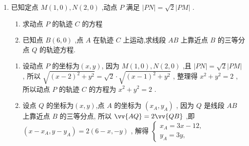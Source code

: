 \begin{enumerate}
\begin{enumerate}
\begin{jieda}
\begin{enumerate}
                \item 设 $M\left( {x,y}\right) ,C\left( {{x}_{0},{y}_{0}}\right)$ ,
                
                因为 $B\left( {3,0}\right)$ ,且 $M$ 是线段 ${BC}$ 的中点，所以由中点坐标公式得 $x = \dfrac{{x}_{0} + 3}{2},y = \dfrac{{y}_{0} + 0}{2}$，所以 ${x}_{0} = {2x} - 3,{y}_{0} = {2y}$ .
                
                由 (1) 知,点 $C$ 的轨迹方程为${\left( x - 1\right) }^{2} + {y}^{2} = 4\left( {y \neq  0}\right)$，将 ${x}_{0} = {2x} - 3,{y}_{0} = {2y}$ 代入得${\left( 2x - 4\right) }^{2} + {\left( 2y\right) }^{2} = 4,$ 即 ${\left( x - 2\right) }^{2} + {y}^{2} = 1\left( {y \neq  0}\right)$ . 
                
                因此动点 $M$ 的轨迹方程为 ${\left( x - 2\right) }^{2} + {y}^{2} = 1\left( {y \neq  0}\right) .$
            \end{enumerate}
        \end{jieda}
        \item 已知定点 $M\left( {1,0}\right) ,N\left( {2,0}\right)$ ,动点 $P$ 满足 $\left| {PN}\right|  = \sqrt{2}\left| {PM}\right|$ . 
        \begin{enumerate}
            \item 求动点 $P$ 的轨迹 $C$ 的方程
            \item 已知点 $B\left( {6,0}\right)$ ,点 $A$ 在轨迹 $C$ 上运动,求线段 ${AB}$ 上靠近点 $B$ 的三等分点 $Q$ 的轨迹方程.
        \end{enumerate}
        \begin{jieda}
            \begin{enumerate}
                \item 设动点 $P$ 的坐标为$(x, y)$, 因为 $M\left( {1,0}\right) ,N\left( {2,0}\right)$ ,且 $\left| {PN}\right|  = \sqrt{2}\left| {PM}\right|$ , 所以 $\sqrt{{\left( x - 2\right) }^{2} + {y}^{2}} = \sqrt{2} \cdot  \sqrt{{\left( x - 1\right) }^{2} + {y}^{2}}$ , 整理得 ${x}^{2} + {y}^{2} = 2$ , 所以动点 $P$ 的轨迹 $C$ 的方程为 ${x}^{2} + {y}^{2} = 2$ .
                \item 设点 $Q$ 的坐标为$(x, y)$,点 $A$ 的坐标为 $\left( {{x}_{A},{y}_{A}}\right)$ , 因为 $Q$ 是线段 ${AB}$ 上靠近点 $B$ 的三等分点, 所以 $\vv{AQ} = 2\vv{QB}$ ,即 $\left( {x - {x}_{A},y - {y}_{A}}\right)  = 2\left( {6 - x, - y}\right)$ , 解得 $\left\{  \begin{array}{l} {x}_{A} = {3x} - {12}, \\  {y}_{A} = {3y}, \end{array}\right.$ 
                

\end{enumerate}
\end{jieda}
\end{enumerate}
\end{enumerate}

